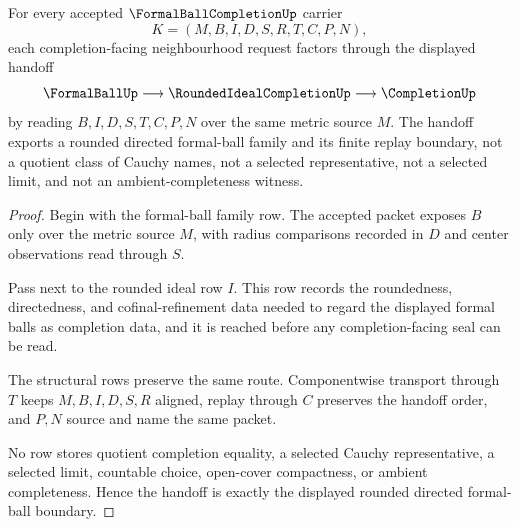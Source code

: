 \begin{theorem}
\label{thm:formal-ball-completion-rounded-ideal-handoff}
For every accepted $\FormalBallCompletionUp$ carrier
$$
K=(M,B,I,D,S,R,T,C,P,N),
$$
each completion-facing neighbourhood request factors through the displayed handoff
$$
\FormalBallUp \longrightarrow \RoundedIdealCompletionUp \longrightarrow \CompletionUp
$$
by reading $B,I,D,S,T,C,P,N$ over the same metric source $M$. The handoff exports a rounded directed formal-ball family and its finite replay boundary, not a quotient class of Cauchy names, not a selected representative, not a selected limit, and not an ambient-completeness witness.
\end{theorem}
\begin{proof}
Begin with the formal-ball family row. The accepted packet exposes $B$ only over the metric source $M$, with radius comparisons recorded in $D$ and center observations read through $S$.

Pass next to the rounded ideal row $I$. This row records the roundedness, directedness, and cofinal-refinement data needed to regard the displayed formal balls as completion data, and it is reached before any completion-facing seal can be read.

The structural rows preserve the same route. Componentwise transport through $T$ keeps $M,B,I,D,S,R$ aligned, replay through $C$ preserves the handoff order, and $P,N$ source and name the same packet.

No row stores quotient completion equality, a selected Cauchy representative, a selected limit, countable choice, open-cover compactness, or ambient completeness. Hence the handoff is exactly the displayed rounded directed formal-ball boundary.
\end{proof}

